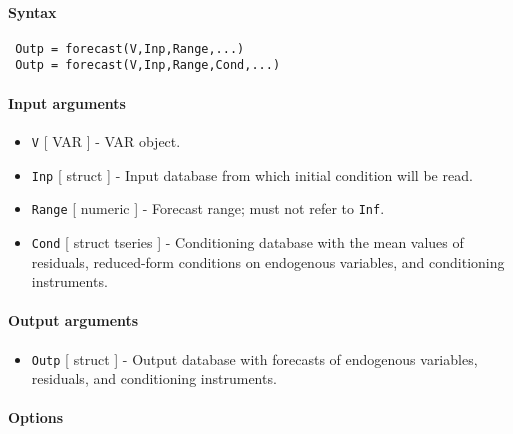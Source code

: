 


	\paragraph{Syntax}
 
 \begin{verbatim}
 Outp = forecast(V,Inp,Range,...)
 Outp = forecast(V,Inp,Range,Cond,...)
 \end{verbatim}
 
 \paragraph{Input arguments}
 
 \begin{itemize}
 \item
   \texttt{V} {[} VAR {]} - VAR object.
 \item
   \texttt{Inp} {[} struct {]} - Input database from which initial
   condition will be read.
 \item
   \texttt{Range} {[} numeric {]} - Forecast range; must not refer to
   \texttt{Inf}.
 \item
   \texttt{Cond} {[} struct \textbar{} tseries {]} - Conditioning
   database with the mean values of residuals, reduced-form conditions on
   endogenous variables, and conditioning instruments.
 \end{itemize}
 
 \paragraph{Output arguments}
 
 \begin{itemize}
 \item
   \texttt{Outp} {[} struct {]} - Output database with forecasts of
   endogenous variables, residuals, and conditioning instruments.
 \end{itemize}
 
 \paragraph{Options}
 
